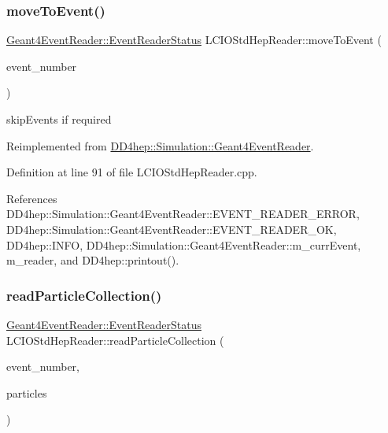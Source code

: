 \subsubsection{\texorpdfstring{move\+To\+Event()}{moveToEvent()}}
{\footnotesize\ttfamily \hyperlink{class_d_d4hep_1_1_simulation_1_1_geant4_event_reader_ae4f4bc83ffcf5b0c1868ad78859851e7}{Geant4\+Event\+Reader\+::\+Event\+Reader\+Status} L\+C\+I\+O\+Std\+Hep\+Reader\+::move\+To\+Event (\begin{DoxyParamCaption}\item[{int}]{event\+\_\+number }\end{DoxyParamCaption})\hspace{0.3cm}{\ttfamily [virtual]}}



skip\+Events if required 



Reimplemented from \hyperlink{class_d_d4hep_1_1_simulation_1_1_geant4_event_reader_a0b6d2fe12ae259534cbe7a5b6e35b642}{D\+D4hep\+::\+Simulation\+::\+Geant4\+Event\+Reader}.



Definition at line 91 of file L\+C\+I\+O\+Std\+Hep\+Reader.\+cpp.



References D\+D4hep\+::\+Simulation\+::\+Geant4\+Event\+Reader\+::\+E\+V\+E\+N\+T\+\_\+\+R\+E\+A\+D\+E\+R\+\_\+\+E\+R\+R\+OR, D\+D4hep\+::\+Simulation\+::\+Geant4\+Event\+Reader\+::\+E\+V\+E\+N\+T\+\_\+\+R\+E\+A\+D\+E\+R\+\_\+\+OK, D\+D4hep\+::\+I\+N\+FO, D\+D4hep\+::\+Simulation\+::\+Geant4\+Event\+Reader\+::m\+\_\+curr\+Event, m\+\_\+reader, and D\+D4hep\+::printout().

\hypertarget{class_d_d4hep_1_1_simulation_1_1_l_c_i_o_std_hep_reader_ab358476ce7a1bab27504d2bfe4b8b630}{}\label{class_d_d4hep_1_1_simulation_1_1_l_c_i_o_std_hep_reader_ab358476ce7a1bab27504d2bfe4b8b630} 
\subsubsection{\texorpdfstring{read\+Particle\+Collection()}{readParticleCollection()}}
{\footnotesize\ttfamily \hyperlink{class_d_d4hep_1_1_simulation_1_1_geant4_event_reader_ae4f4bc83ffcf5b0c1868ad78859851e7}{Geant4\+Event\+Reader\+::\+Event\+Reader\+Status} L\+C\+I\+O\+Std\+Hep\+Reader\+::read\+Particle\+Collection (\begin{DoxyParamCaption}\item[{int}]{event\+\_\+number,  }\item[{E\+V\+E\+N\+T\+::\+L\+C\+Collection $\ast$$\ast$}]{particles }\end{DoxyParamCaption})\hspace{0.3cm}{\ttfamily [virtual]}}



